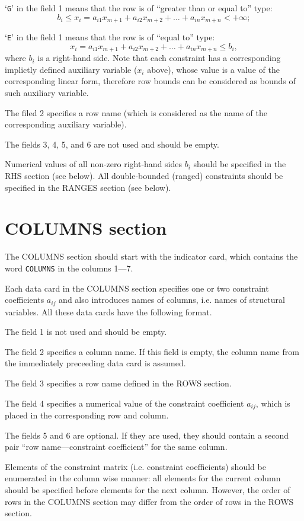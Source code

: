 `\verb|G|' in the field 1 means that the row is of ``greater than or
equal to'' type:
$$b_i \leq x_i = a_{i1}x_{m+1} + a_{i2}x_{m+2} + \dots + a_{in}x_{m+n}
< +\infty;$$

`\verb|E|' in the field 1 means that the row is of ``equal to'' type:
$$x_i = a_{i1}x_{m+1} + a_{i2}x_{m+2} + \dots + a_{in}x_{m+n} \leq
b_i,$$
where $b_i$ is a right-hand side. Note that each constraint has a
corresponding implictly defined auxiliary variable ($x_i$ above), whose
value is a value of the corresponding linear form, therefore row bounds
can be considered as bounds of such auxiliary variable.

The filed 2 specifies a row name (which is considered as the name of
the corresponding auxiliary variable).

The fields 3, 4, 5, and 6 are not used and should be empty.

Numerical values of all non-zero right-hand sides $b_i$ should be
specified in the RHS section (see below). All double-bounded (ranged)
constraints should be specified in the RANGES section (see below).

\section{COLUMNS section}

The COLUMNS section should start with the indicator card, which contains
the word \verb|COLUMNS| in the columns 1---7.

Each data card in the COLUMNS section specifies one or two constraint
coefficients $a_{ij}$ and also introduces names of columns, i.e. names
of structural variables. All these data cards have the following format.

The field 1 is not used and should be empty.

The field 2 specifies a column name. If this field is empty, the column
name from the immediately preceeding data card is assumed.

The field 3 specifies a row name defined in the ROWS section.

The field 4 specifies a numerical value of the constraint coefficient
$a_{ij}$, which is placed in the corresponding row and column.

The fields 5 and 6 are optional. If they are used, they should contain
a second pair ``row name---constraint coefficient'' for the same column.

Elements of the constraint matrix (i.e. constraint coefficients) should
be enumerated in the column wise manner: all elements for the current
column should be specified before elements for the next column. However,
the order of rows in the COLUMNS section may differ from the order of
rows in the ROWS section.

